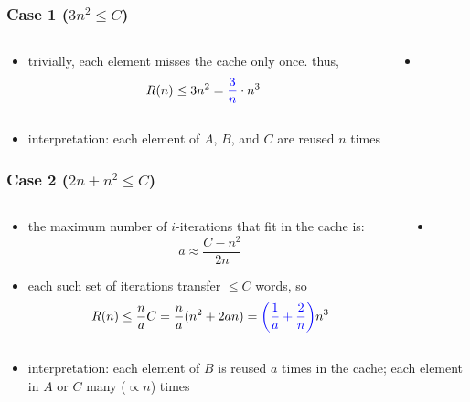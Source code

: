 \documentclass[12pt,dvipdfmx]{beamer}
\newcommand{\ao}[1]{{\color{blue}#1}}
\begin{document}
\begin{frame}[fragile]
\frametitle{Case 1 ($3n^2 \leq C$)}
\begin{columns}
  \begin{column}{0.5\textwidth}
\begin{itemize}
\item trivially, each element misses the cache only once. thus,
\[ R(n) \leq 3n^2 = \ao{\frac{3}{n}} \cdot n^3 \]
\end{itemize}
\end{column}

\begin{column}{0.5\textwidth}
  \begin{itemize}
  \item []
{\tiny\def\svgwidth{0.9\textwidth}
}
\end{itemize}
\end{column}
\end{columns}

\begin{itemize}
\item [] 
\ao{interpretation:} each element of $A$, $B$, and $C$ are reused $n$ times
\end{itemize}
\end{frame}


\begin{frame}[fragile]
\frametitle{Case 2 ($2n + n^2 \leq C$)}
\begin{columns}
  \begin{column}{0.5\textwidth}
\begin{itemize}
\item the maximum number of $i$-iterations
  that fit in the cache is:
\[ a \approx \frac{C - n^2}{2n} \]
\item each such set of iterations transfer $\leq C$ words, so
\[ R(n) \leq \frac{n}{a} C 
= \frac{n}{a} (n^2 + 2an)
= \ao{\left(\frac{1}{a}+\frac{2}{n}\right)} n^3
\]
\end{itemize}
\end{column}

\begin{column}{0.5\textwidth}
  \begin{itemize}
  \item []
{\tiny\def\svgwidth{0.9\textwidth}
}
\end{itemize}
\end{column}
\end{columns}

\begin{itemize}
\item []
\ao{interpretation:} each element of $B$ is reused $a$ times in the cache;
each element in $A$ or $C$ many ($\propto n$) times 
\end{itemize}
\end{frame}
\end{document}
